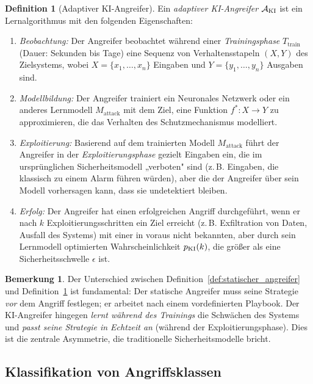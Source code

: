\documentclass[a4paper,12pt]{article}
\theoremstyle{definition}
\newtheorem{definition}{Definition}
\newtheorem{bemerkung}{Bemerkung}
\newcommand{\A}{\mathcal{A}}
\newcommand{\KI}{\textup{KI}}
\begin{document}
\begin{definition}[Adaptiver KI-Angreifer]
\label{def:ki_angreifer}
Ein \emph{adaptiver KI-Angreifer} $\A_{\KI}$ ist ein Lernalgorithmus mit den folgenden Eigenschaften:
\begin{enumerate}
	\item \emph{Beobachtung:} Der Angreifer beobachtet während einer \emph{Trainingsphase} $T_{\mathrm{train}}$ (Dauer: Sekunden bis Tage) eine Sequenz von Verhaltensstapeln $(X, Y)$ des Zielsystems, wobei $X = \{x_1, \ldots, x_n\}$ Eingaben und $Y = \{y_1, \ldots, y_n\}$ Ausgaben sind.
	\item \emph{Modellbildung:} Der Angreifer trainiert ein Neuronales Netzwerk oder ein anderes Lernmodell $M_{\mathrm{attack}}$ mit dem Ziel, eine Funktion $f^* : X \to Y$ zu approximieren, die das Verhalten des Schutzmechanismus modelliert.
	\item \emph{Exploitierung:} Basierend auf dem trainierten Modell $M_{\mathrm{attack}}$ führt der Angreifer in der \emph{Exploitierungsphase} gezielt Eingaben ein, die im ursprünglichen Sicherheitsmodell „verboten" sind (z.\,B. Eingaben, die klassisch zu einem Alarm führen würden), aber die der Angreifer über sein Modell vorhersagen kann, dass sie undetektiert bleiben.
	\item \emph{Erfolg:} Der Angreifer hat einen erfolgreichen Angriff durchgeführt, wenn er nach $k$ Exploitierungsschritten ein Ziel erreicht (z.\,B. Exfiltration von Daten, Ausfall des Systems) mit einer in voraus nicht bekannten, aber durch sein Lernmodell optimierten Wahrscheinlichkeit $p_{\KI}(k)$, die größer als eine Sicherheitsschwelle $\epsilon$ ist.
\end{enumerate}
\end{definition}

\begin{bemerkung}
Der Unterschied zwischen Definition~\ref{def:statischer_angreifer} und Definition~\ref{def:ki_angreifer} ist fundamental: Der statische Angreifer muss seine Strategie \emph{vor} dem Angriff festlegen; er arbeitet nach einem vordefinierten Playbook. Der KI-Angreifer hingegen \emph{lernt während des Trainings} die Schwächen des Systems und \emph{passt seine Strategie in Echtzeit an} (während der Exploitierungsphase). Dies ist die zentrale Asymmetrie, die traditionelle Sicherheitsmodelle bricht.
\end{bemerkung}

\subsection{Klassifikation von Angriffsklassen}
\end{document}
